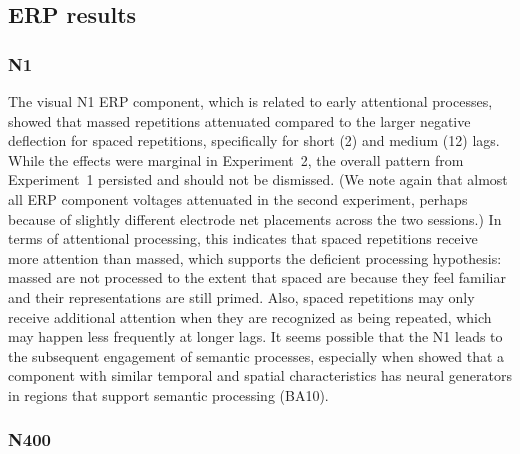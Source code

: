 \subsection{ERP results}



\subsubsection{N1}


The visual N1 ERP component, which is related to early attentional processes, showed that massed repetitions attenuated compared to the larger negative deflection for spaced repetitions, specifically for short (2) and medium (12) lags.  While the effects were marginal in Experiment~2, the overall pattern from Experiment~1 persisted and should not be dismissed. (We note again that almost all ERP component voltages attenuated in the second experiment, perhaps because of slightly different electrode net placements across the two sessions.)  In terms of attentional processing, this indicates that spaced repetitions receive more attention than massed, which supports the deficient processing hypothesis: massed are not processed to the extent that spaced are because they feel familiar and their representations are still primed.  Also, spaced repetitions may only receive additional attention when they are recognized as being repeated, which may happen less frequently at longer lags.  It seems possible that the N1 leads to the subsequent engagement of semantic processes, especially when  showed that a component with similar temporal and spatial characteristics has neural generators in regions that support semantic processing (BA10).

\subsubsection{N400}


